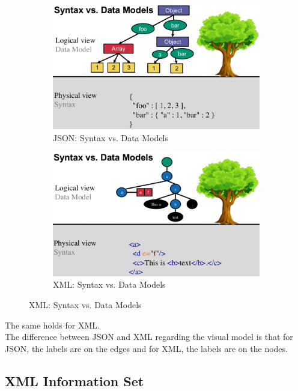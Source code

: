 \documentclass[11pt,oneside,a4paper]{article}
\begin{document}
\begin{figure}[hb!]
	\centering
	\begin{subfigure}[t]{.5\textwidth}
		\centering
		\includegraphics[width=0.9\linewidth]{figures/json_syntax_datamodel}
		\caption{JSON: Syntax vs. Data Models}
		\label{fig:json_syntax_datamodel}
	\end{subfigure}%
	\begin{subfigure}[t]{.5\textwidth}
		\centering
		\includegraphics[width=0.9\linewidth]{figures/xml_syntax_datamodel}
		\caption{XML: Syntax vs. Data Models}
		\label{fig:xml_syntax_datamodel}
	\end{subfigure}
\end{figure}

The same holds for XML.\\

The difference between JSON and XML regarding the visual model is that for JSON, the labels are on the edges and for XML, the labels are on the nodes.

\subsection{XML Information Set}
\end{document}
